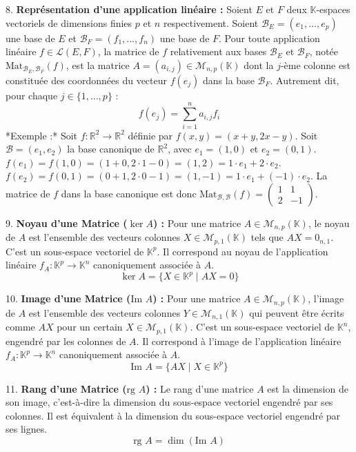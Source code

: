 \documentclass[12pt,a4paper]{report}
\begin{document}
8.  \textbf{Représentation d'une application linéaire :} Soient $E$ et $F$ deux $\mathbb{K}$-espaces vectoriels de dimensions finies $p$ et $n$ respectivement. Soient $\mathcal{B}_E = (e_1, \dots, e_p)$ une base de $E$ et $\mathcal{B}_F = (f_1, \dots, f_n)$ une base de $F$. Pour toute application linéaire $f \in \mathcal{L}(E, F)$, la matrice de $f$ relativement aux bases $\mathcal{B}_E$ et $\mathcal{B}_F$, notée $\text{Mat}_{\mathcal{B}_E, \mathcal{B}_F}(f)$, est la matrice $A = (a_{i,j}) \in \mathcal{M}_{n,p}(\mathbb{K})$ dont la $j$-ème colonne est constituée des coordonnées du vecteur $f(e_j)$ dans la base $\mathcal{B}_F$. Autrement dit, pour chaque $j \in \{1, \dots, p\}$ :
    $$f(e_j) = \sum_{i=1}^n a_{i,j} f_i$$
    *Exemple :* Soit $f: \mathbb{R}^2 \to \mathbb{R}^2$ définie par $f(x,y) = (x+y, 2x-y)$. Soit $\mathcal{B} = (e_1, e_2)$ la base canonique de $\mathbb{R}^2$, avec $e_1=(1,0)$ et $e_2=(0,1)$.
    $f(e_1) = f(1,0) = (1+0, 2\cdot 1 - 0) = (1,2) = 1 \cdot e_1 + 2 \cdot e_2$.
    $f(e_2) = f(0,1) = (0+1, 2\cdot 0 - 1) = (1,-1) = 1 \cdot e_1 + (-1) \cdot e_2$.
    La matrice de $f$ dans la base canonique est donc $\text{Mat}_{\mathcal{B}, \mathcal{B}}(f) = \begin{pmatrix} 1 & 1 \\ 2 & -1 \end{pmatrix}$.

9.  \textbf{Noyau d'une Matrice ($\ker A$) :} Pour une matrice $A \in \mathcal{M}_{n,p}(\mathbb{K})$, le noyau de $A$ est l'ensemble des vecteurs colonnes $X \in \mathcal{M}_{p,1}(\mathbb{K})$ tels que $AX = 0_{n,1}$. C'est un sous-espace vectoriel de $\mathbb{K}^p$. Il correspond au noyau de l'application linéaire $f_A: \mathbb{K}^p \to \mathbb{K}^n$ canoniquement associée à $A$.
    $$\ker A = \{X \in \mathbb{K}^p \mid AX = 0\}$$

10. \textbf{Image d'une Matrice ($\text{Im } A$) :} Pour une matrice $A \in \mathcal{M}_{n,p}(\mathbb{K})$, l'image de $A$ est l'ensemble des vecteurs colonnes $Y \in \mathcal{M}_{n,1}(\mathbb{K})$ qui peuvent être écrits comme $AX$ pour un certain $X \in \mathcal{M}_{p,1}(\mathbb{K})$. C'est un sous-espace vectoriel de $\mathbb{K}^n$, engendré par les colonnes de $A$. Il correspond à l'image de l'application linéaire $f_A: \mathbb{K}^p \to \mathbb{K}^n$ canoniquement associée à $A$.
    $$\text{Im } A = \{AX \mid X \in \mathbb{K}^p\}$$

11. \textbf{Rang d'une Matrice ($\text{rg } A$) :} Le rang d'une matrice $A$ est la dimension de son image, c'est-à-dire la dimension du sous-espace vectoriel engendré par ses colonnes. Il est équivalent à la dimension du sous-espace vectoriel engendré par ses lignes.
    $$\text{rg } A = \dim(\text{Im } A)$$
\end{document}
